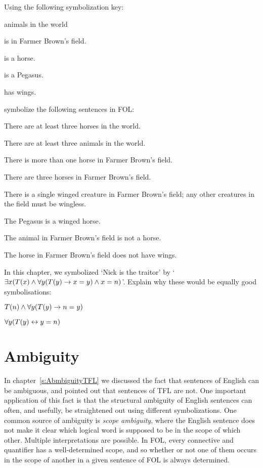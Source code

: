 \problempart Using the following symbolization key:
\begin{ekey}
\item[\text{domain}] animals in the world
\item[\atom{B}{x}]  is in Farmer Brown's field.
\item[\atom{H}{x}]  is a horse.
\item[\atom{P}{x}]  is a Pegasus.
\item[\atom{W}{x}]  has wings.
\end{ekey}
symbolize the following sentences in FOL:
\begin{earg}
\item There are at least three horses in the world.
\item There are at least three animals in the world.
\item There is more than one horse in Farmer Brown's field.
\item There are three horses in Farmer Brown's field.
\item There is a single winged creature in Farmer Brown's field; any other creatures in the field must be wingless.
\item The Pegasus is a winged horse.
\item The animal in Farmer Brown's field is not a horse.
\item The horse in Farmer Brown's field does not have wings.
\end{earg}

\problempart
In this chapter, we symbolized `Nick is the traitor' by `$\exists x (\mathord{T}(x) \wedge \forall y(\mathord{T}(y) \rightarrow x = y) \wedge x = n)$'. Explain why these would be equally good symbolisations:
	\begin{ebullet}
		\item $\mathord{T}(n) \wedge \forall y(\mathord{T}(y) \rightarrow n = y)$
		\item $\forall y(\mathord{T}(y) \leftrightarrow y = n)$
	\end{ebullet}


\chapter{Ambiguity}

In chapter~\ref{s:AbmbiguityTFL} we discussed the fact that sentences of English can be ambiguous, and pointed out that sentences of TFL are not. One important application of this fact is that the structural ambiguity of English sentences can often, and usefully, be straightened out using different symbolizations.  One common source of ambiguity is \emph{scope ambiguity}, where the English sentence does not make it clear which logical word is supposed to be in the scope of which other. Multiple interpretations are possible.  In FOL, every connective and quantifier has a well-determined scope, and so whether or not one of them occurs in the scope of another in a given sentence of FOL is always determined.


